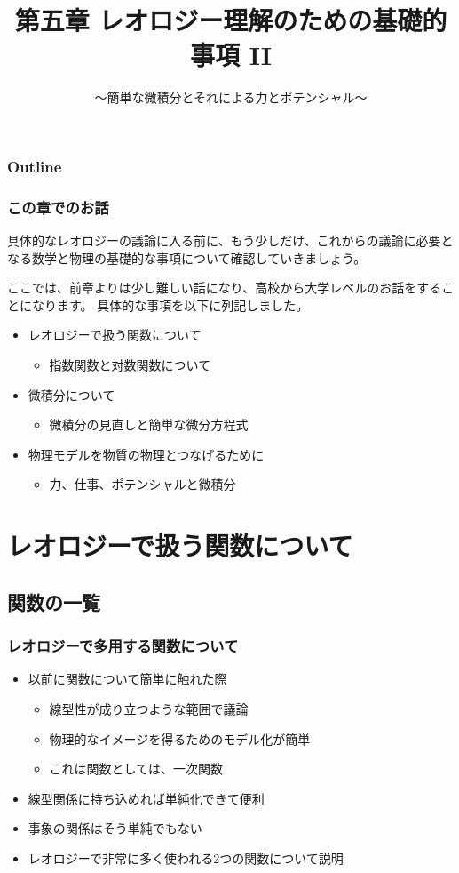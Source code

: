 \documentclass[unicode,12pt,aspectratio=169]{beamer}
\title{第五章 レオロジー理解のための基礎的事項 II}
\subtitle{～簡単な微積分とそれによる力とポテンシャル～}
\date{}
\begin{document}
\maketitle

\begin{frame}
\frametitle{Outline}
\tableofcontents
\end{frame}

\begin{frame}
	\frametitle{この章でのお話}
	具体的なレオロジーの議論に入る前に、もう少しだけ、これからの議論に必要となる数学と物理の基礎的な事項について確認していきましょう。
	
	ここでは、前章よりは少し難しい話になり、高校から大学レベルのお話をすることになります。
	具体的な事項を以下に列記しました。
	\begin{itemize}
		\item レオロジーで扱う関数について
		\begin{itemize}
			\item 指数関数と対数関数について
		\end{itemize} 
		\item 微積分について
		\begin{itemize}
			\item 微積分の見直しと簡単な微分方程式
		\end{itemize} 
		\item 物理モデルを物質の物理とつなげるために
		\begin{itemize}
			\item 力、仕事、ポテンシャルと微積分
		\end{itemize} 
	\end{itemize}
\end{frame}

\section{レオロジーで扱う関数について}
\subsection{関数の一覧}
\begin{frame}
	\frametitle{レオロジーで多用する関数について}
	\begin{itemize}
		\item 以前に関数について簡単に触れた際
		\begin{itemize}
			\item 線型性が成り立つような範囲で議論
			\item 物理的なイメージを得るためのモデル化が簡単
			\item これは関数としては、一次関数
		\end{itemize}
		\item 線型関係に持ち込めれば単純化できて便利
		\item 事象の関係はそう単純でもない
		\item \alert{レオロジーで非常に多く使われる2つの関数について説明}
	\end{itemize}
	
\end{frame}
\end{document}

